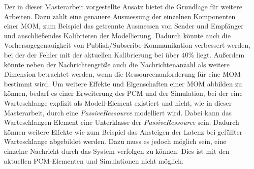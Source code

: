 Der in dieser Masterarbeit vorgestellte Ansatz bietet die Grundlage für weitere Arbeiten. Dazu zählt eine genauere Ausmessung der einzelnen Komponenten einer MOM, zum Beispiel das getrennte Ausmessen von Sender und Empfänger und anschließendes Kalibrieren der Modellierung. Dadurch könnte auch die Vorhersagegenauigkeit von Publish/Subscribe-Kommunikation verbessert werden, bei der der Fehler mit der aktuellen Kalibrierung bei über 40\% liegt. Außerdem könnte neben der Nachrichtengröße auch die Nachrichtenanzahl als weitere Dimension betrachtet werden, wenn die Ressourcenanforderung für eine MOM bestimmt wird. Um weitere Effekte und Eigenschaften einer MOM abbilden zu können, bedarf es einer Erweiterung des PCM und der Simulation, bei der eine Warteschlange explizit als Modell-Element existiert und nicht, wie in dieser Masterarbeit, durch eine \emph{PassiveRessource} modelliert wird. Dabei kann das Warteschlangen-Element eine Unterklasse der \emph{PassiveRessource} sein. Dadurch können weitere Effekte wie zum Beispiel das Ansteigen der Latenz bei gefüllter Warteschlange abgebildet werden. Dazu muss es jedoch möglich sein, eine einzelne Nachricht durch das System verfolgen zu können. Dies ist mit den aktuellen PCM-Elementen und Simulationen nicht möglich.